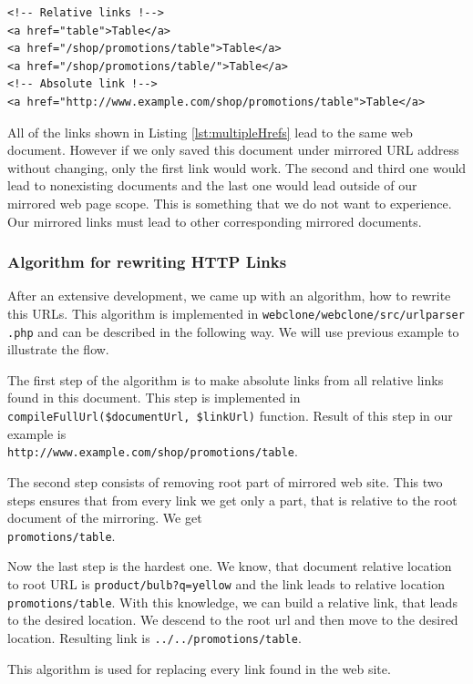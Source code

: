 \begin{lstlisting}[caption={Multiple types of HTTP links},label={lst:multipleHrefs}]
<!-- Relative links !-->
<a href="table">Table</a>
<a href="/shop/promotions/table">Table</a>
<a href="/shop/promotions/table/">Table</a>
<!-- Absolute link !-->
<a href="http://www.example.com/shop/promotions/table">Table</a>
\end{lstlisting}

All of the links shown in Listing \ref{lst:multipleHrefs} lead to the same web document. However if we only saved this document under mirrored URL address without changing, only the first link would work. The second and third one would lead to nonexisting documents and the last one would lead outside of our mirrored web page scope. This is something that we do not want to experience. Our mirrored links must lead to other corresponding mirrored documents.

\subsubsection{Algorithm for rewriting HTTP Links}
After an extensive development, we came up with an algorithm, how to rewrite this URLs. This algorithm is implemented in \texttt{webclone/webclone/src/urlparser .php} and can be described in the following way. We will use previous example to illustrate the flow.

The first step of the algorithm is to make absolute links from all relative links found in this document. This step is implemented in \texttt{compileFullUrl(\$documentUrl, \$link\-Url)} function. Result of this step in our example is \\ \texttt{http://www.example.com/shop/promotions/table}.

The second step consists of removing root part of mirrored web site. This two steps ensures that from every link we get only a part, that is relative to the root document of the mirroring. We get \\ \texttt{promotions/table}.

Now the last step is the hardest one. We know, that document relative location to root URL is \texttt{product/bulb?q=yellow} and the link leads to relative location \texttt{promotions/table}. With this knowledge, we can build a relative link, that leads to the desired location. We descend to the root url and then move to the desired location. Resulting link is \texttt{../../promotions/table}. 

This algorithm is used for replacing every link found in the web site.

